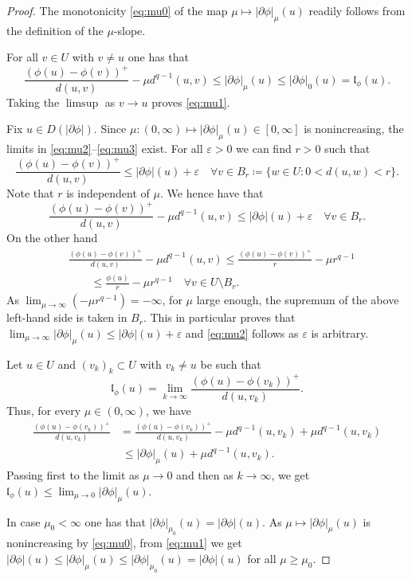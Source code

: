 \documentclass[reqno]{amsart}
\newcommand{\epsi}{\varepsilon}
\renewcommand{\sl}{|\partial \phi|}
\newcommand{\gl}{\mathfrak{l}_\phi}
\begin{document}
\begin{proof}
  The monotonicity  \eqref{eq:mu0}  of the map $\mu \mapsto \sl_\mu(u)$ readily follows
  from the definition of the $\mu$-slope.
  
  For all $v\in U$  with $v \ne u$  one has that
  $$\frac{(\phi(u) -
    \phi(v))^+}{d(u,v)} -  {\mu}d^{q-1}(u,v) \leq \sl_\mu(u)
  \leq  \sl_0(u)= \gl(u).$$
  Taking the $\limsup$ as $v\to u$ proves \eqref{eq:mu1}.

  Fix $u \in D(\sl)$.   Since   $\mu:(0,\infty)\mapsto
  \sl_\mu(u)\in [0,\infty]$  is nonincreasing, the  
  limits in \eqref{eq:mu2}--\eqref{eq:mu3} exist. For all $\epsi>0$ we can find $r>0$ such that 
$$\frac{(\phi(u) -
    \phi(v))^+}{d(u,v)} \leq \sl(u)+\epsi \quad \forall v \in B_r\coloneqq\{w\in U :  0 <  d(u,w)<r\} .$$
  Note that $r$ is independent of $\mu$. We hence have that 
  $$\frac{(\phi(u) -
    \phi(v))^+}{d(u,v)} -  {\mu}d^{q-1}(u,v) \leq \sl(u)+\epsi
  \quad \forall v \in B_r .$$
  On the other hand
   \begin{align*}
       & \frac{(\phi(u) -
    \phi(v))^+}{d(u,v)} -  {\mu}d^{q-1}(u,v) \leq \frac{(\phi(u) -
    \phi(v))^+}{r} -  {\mu}r^{q-1}  \\
    &\qquad \le \frac{\phi(u)}{r} - \mu r^{q-1}  \quad \forall v \in
  U\setminus B_r.
  \end{align*}
  As $\lim_{\mu \to \infty}(-\mu r^{q-1}) = -\infty$,  for $\mu$ large enough,  the supremum of the
  above left-hand side is taken in $B_r$. This in particular proves that  
  $ \lim_{\mu \to \infty} \sl_\mu(u) \leq \sl(u)+\epsi$ 
  and \eqref{eq:mu2} follows as $\epsi$ is arbitrary.
  
 Let $u \in U$ and $(v_k)_k \subset U$ with $v_k \ne u$ be such that
\[
\gl(u) = \lim_{k \to \infty} \frac{(\phi(u) -
    \phi(v_k))^+}{d(u,v_k)}.
\]
Thus, for every $\mu \in (0,\infty)$, we have
\begin{align*}
\frac{(\phi(u) -  \phi(v_k))^+}{d(u,v_k)} &= \frac{(\phi(u) -  \phi(v_k))^+}{d(u,v_k)} - \mu d^{q-1}(u,v_k) + \mu d^{q-1} (u,v_k)
  \\
  &\ \leq \sl_\mu(u) + \mu d^{q-1} (u,v_k).
\end{align*}
Passing first to the limit as $\mu \to 0$ and then as $k \to \infty$, we get $\gl (u) \le \lim_{\mu \to 0} \sl_{\mu}(u)$.


  In case $\mu_0 <\infty$ one has that $\sl_{\mu_0}(u) = \sl(u)$. As
  $\mu \mapsto \sl_\mu(u)$ is nonincreasing by \eqref{eq:mu0}, from
  \eqref{eq:mu1} we get
  $\sl(u) \leq \sl_\mu(u) \leq \sl_{\mu_0}(u) = \sl(u)$ for all $\mu
  \geq \mu_0$. 
\end{proof}
\end{document}
